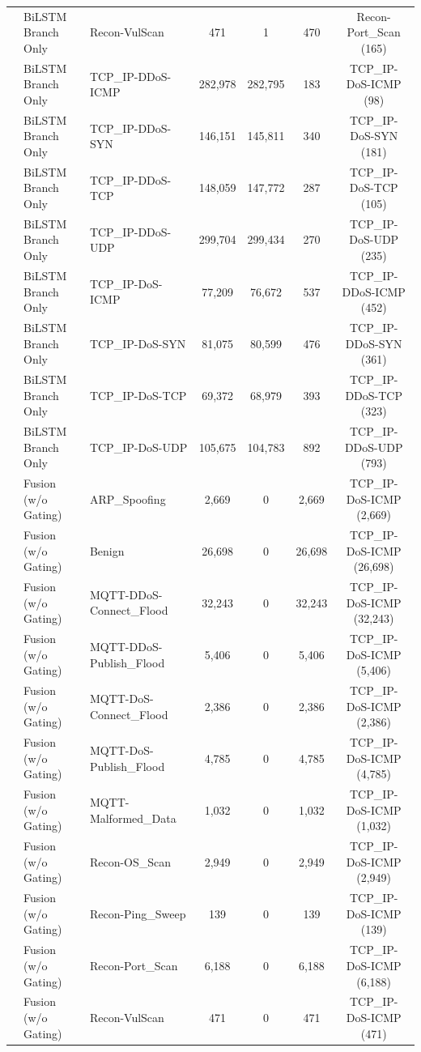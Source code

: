 \documentclass[a4paper,fleqn]{cas-sc}
\begin{document}
\begin{landscape}
\begin{longtable}{lllcccc}
 & BiLSTM Branch Only & Recon-VulScan & 471 & 1 & 470 & Recon-Port\_Scan (165) \\
 & BiLSTM Branch Only & TCP\_IP-DDoS-ICMP & 282,978 & 282,795 & 183 & TCP\_IP-DoS-ICMP (98) \\
 & BiLSTM Branch Only & TCP\_IP-DDoS-SYN & 146,151 & 145,811 & 340 & TCP\_IP-DoS-SYN (181) \\
 & BiLSTM Branch Only & TCP\_IP-DDoS-TCP & 148,059 & 147,772 & 287 & TCP\_IP-DoS-TCP (105) \\
 & BiLSTM Branch Only & TCP\_IP-DDoS-UDP & 299,704 & 299,434 & 270 & TCP\_IP-DoS-UDP (235) \\
 & BiLSTM Branch Only & TCP\_IP-DoS-ICMP & 77,209 & 76,672 & 537 & TCP\_IP-DDoS-ICMP (452) \\
 & BiLSTM Branch Only & TCP\_IP-DoS-SYN & 81,075 & 80,599 & 476 & TCP\_IP-DDoS-SYN (361) \\
 & BiLSTM Branch Only & TCP\_IP-DoS-TCP & 69,372 & 68,979 & 393 & TCP\_IP-DDoS-TCP (323) \\
 & BiLSTM Branch Only & TCP\_IP-DoS-UDP & 105,675 & 104,783 & 892 & TCP\_IP-DDoS-UDP (793) \\
 & Fusion (w/o Gating) & ARP\_Spoofing & 2,669 & 0 & 2,669 & TCP\_IP-DoS-ICMP (2,669) \\
 & Fusion (w/o Gating) & Benign & 26,698 & 0 & 26,698 & TCP\_IP-DoS-ICMP (26,698) \\
 & Fusion (w/o Gating) & MQTT-DDoS-Connect\_Flood & 32,243 & 0 & 32,243 & TCP\_IP-DoS-ICMP (32,243) \\
 & Fusion (w/o Gating) & MQTT-DDoS-Publish\_Flood & 5,406 & 0 & 5,406 & TCP\_IP-DoS-ICMP (5,406) \\
 & Fusion (w/o Gating) & MQTT-DoS-Connect\_Flood & 2,386 & 0 & 2,386 & TCP\_IP-DoS-ICMP (2,386) \\
 & Fusion (w/o Gating) & MQTT-DoS-Publish\_Flood & 4,785 & 0 & 4,785 & TCP\_IP-DoS-ICMP (4,785) \\
 & Fusion (w/o Gating) & MQTT-Malformed\_Data & 1,032 & 0 & 1,032 & TCP\_IP-DoS-ICMP (1,032) \\
 & Fusion (w/o Gating) & Recon-OS\_Scan & 2,949 & 0 & 2,949 & TCP\_IP-DoS-ICMP (2,949) \\
 & Fusion (w/o Gating) & Recon-Ping\_Sweep & 139 & 0 & 139 & TCP\_IP-DoS-ICMP (139) \\
 & Fusion (w/o Gating) & Recon-Port\_Scan & 6,188 & 0 & 6,188 & TCP\_IP-DoS-ICMP (6,188) \\
 & Fusion (w/o Gating) & Recon-VulScan & 471 & 0 & 471 & TCP\_IP-DoS-ICMP (471) \\

\end{longtable}
\end{landscape}
\end{document}

